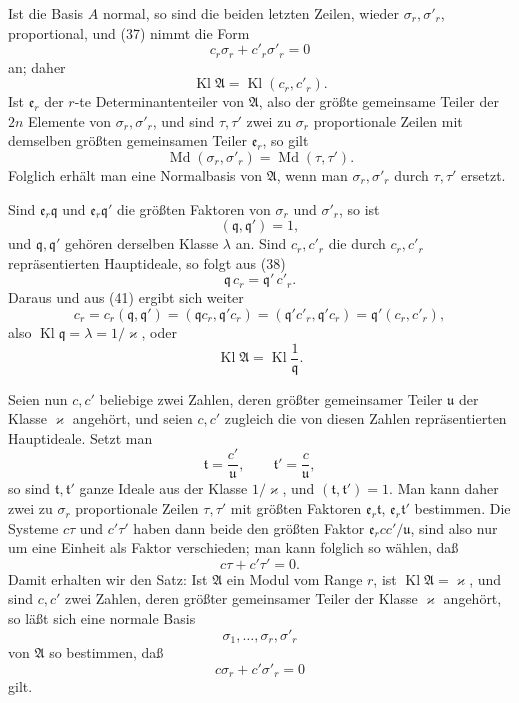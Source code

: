 \documentclass[11pt,a4paper]{article}
\newcommand{\Kl}{\operatorname{Kl}}
\begin{document}
Ist die Basis \(A\) normal, so sind die beiden letzten Zeilen, wieder \(\sigma_r,\sigma'_r\), proportional, und (37) nimmt die Form
\[
 c_r\sigma_r+c'_r\sigma'_r=0 \tag{38}
\]
an; daher
\[
 \Kl\mathfrak A=\Kl(c_r,c'_r). \tag{39}
\]
Ist \(\mathfrak e_r\) der \(r\)-te Determinantenteiler von \(\mathfrak A\), also der größte gemeinsame Teiler der \(2n\) Elemente von \(\sigma_r,\sigma'_r\), und sind \(\tau,\tau'\) zwei zu \(\sigma_r\) proportionale Zeilen mit demselben größten gemeinsamen Teiler \(\mathfrak e_r\), so gilt
\[
 \operatorname{Md}(\sigma_r,\sigma'_r)=\operatorname{Md}(\tau,\tau'). \tag{40}
\]
Folglich erhält man eine Normalbasis von \(\mathfrak A\), wenn man \(\sigma_r,\sigma'_r\) durch \(\tau,\tau'\) ersetzt.

Sind \(\mathfrak e_r\mathfrak q\) und \(\mathfrak e_r\mathfrak q'\) die größten Faktoren von \(\sigma_r\) und \(\sigma'_r\), so ist
\[
 (\mathfrak q,\mathfrak q')=1, \tag{41}
\]
und \(\mathfrak q,\mathfrak q'\) gehören derselben Klasse \(\lambda\) an. Sind \(c_r,c'_r\) die durch \(c_r,c'_r\) repräsentierten Hauptideale, so folgt aus (38)
\[
 \mathfrak q\,c_r=\mathfrak q'\,c'_r.
\]
Daraus und aus (41) ergibt sich weiter
\[
 c_r=c_r(\mathfrak q,\mathfrak q')=(\mathfrak q c_r,\mathfrak q'c_r)
       =(\mathfrak q'c'_r,\mathfrak q'c_r)=\mathfrak q'(c_r,c'_r),
\]
also \(\Kl\mathfrak q=\lambda=1/\varkappa\), oder
\[
 \Kl\mathfrak A=\Kl\frac{1}{\mathfrak q}. \tag{42}
\]

Seien nun \(c,c'\) beliebige zwei Zahlen, deren größter gemeinsamer Teiler \(\mathfrak u\) der Klasse \(\varkappa\) angehört, und seien \(c,c'\) zugleich die von diesen Zahlen repräsentierten Hauptideale. Setzt man
\[
 \mathfrak t=\frac{c'}{\mathfrak u},\qquad
 \mathfrak t'=\frac{c}{\mathfrak u},
\]
so sind \(\mathfrak t,\mathfrak t'\) ganze Ideale aus der Klasse \(1/\varkappa\), und \((\mathfrak t,\mathfrak t')=1\). Man kann daher zwei zu \(\sigma_r\) proportionale Zeilen \(\tau,\tau'\) mit größten Faktoren \(\mathfrak e_r\mathfrak t\), \(\mathfrak e_r\mathfrak t'\) bestimmen. Die Systeme \(c\tau\) und \(c'\tau'\) haben dann beide den größten Faktor \(\mathfrak e_r cc'/\mathfrak u\), sind also nur um eine Einheit als Faktor verschieden; man kann folglich so wählen, daß
\[
 c\tau+c'\tau'=0.
\]
Damit erhalten wir den Satz: Ist \(\mathfrak A\) ein Modul vom Range \(r\), ist \(\Kl\mathfrak A=\varkappa\), und sind \(c,c'\) zwei Zahlen, deren größter gemeinsamer Teiler der Klasse \(\varkappa\) angehört, so läßt sich eine normale Basis
\[
 \sigma_1,\ldots,\sigma_r,\sigma'_r
\]
von \(\mathfrak A\) so bestimmen, daß
\[
 c\sigma_r+c'\sigma'_r=0
\]
gilt.
\end{document}
